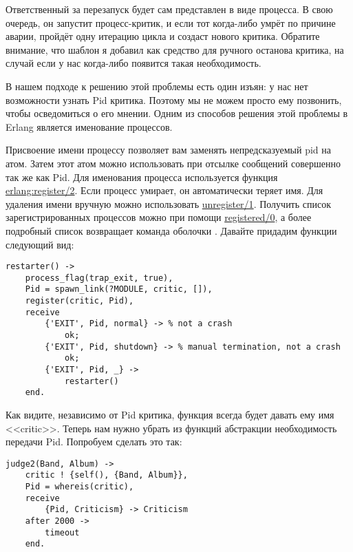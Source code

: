 Ответственный за перезапуск будет сам представлен в виде процесса.
В свою очередь, он запустит процесс\--критик, и если тот когда\--либо умрёт по причине аварии,  пройдёт одну итерацию цикла и создаст нового критика.
Обратите внимание, что шаблон  я добавил как средство для ручного останова критика, на случай если у нас когда\--либо появится такая необходимость.

В нашем подходе к решению этой проблемы есть один изъян: у нас нет возможности узнать Pid критика.
Поэтому мы не можем просто ему позвонить, чтобы осведомиться о его мнении.
Одним из способов решения этой проблемы в Erlang является именование процессов.

Присвоение имени процессу позволяет вам заменять непредсказуемый pid на атом.
Затем этот атом можно использовать при отсылке сообщений совершенно так же как Pid.
Для именования процесса используется функция \href{http://erldocs.com/R15B/erts/erlang.html\#register/2}{erlang:register/2}.
Если процесс умирает, он автоматически теряет имя.
Для удаления имени вручную можно использовать \href{http://erldocs.com/R15B/erts/erlang.html\#unregister/1}{unregister/1}.
Получить список зарегистрированных процессов можно при помощи \href{http://erldocs.com/R15B/erts/erlang.html\#registered/0}{registered/0}, а более подробный список возвращает команда оболочки .
Давайте придадим функции  следующий вид:
\begin{lstlisting}[style=erlang]
restarter() ->
    process_flag(trap_exit, true),
    Pid = spawn_link(?MODULE, critic, []),
    register(critic, Pid),
    receive
        {'EXIT', Pid, normal} -> % not a crash
            ok;
        {'EXIT', Pid, shutdown} -> % manual termination, not a crash
            ok;
        {'EXIT', Pid, _} ->
            restarter()
    end.
\end{lstlisting}

Как видите, независимо от Pid критика, функция  всегда будет давать ему имя <<critic>>.
Теперь нам нужно убрать из функций абстракции необходимость передачи Pid.
Попробуем сделать это так:
\begin{lstlisting}[style=erlang]
judge2(Band, Album) ->
    critic ! {self(), {Band, Album}},
    Pid = whereis(critic),
    receive
        {Pid, Criticism} -> Criticism
    after 2000 ->
        timeout
    end.
\end{lstlisting}

